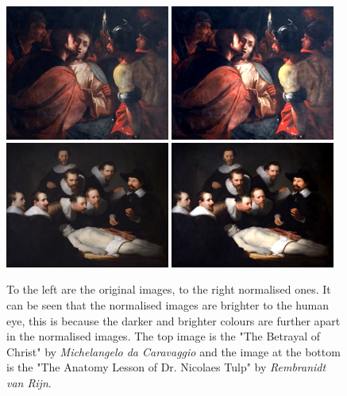 \documentclass[11pt,a4paper,draft]{report}
\begin{document}
\begin{multicols}{2}
\begin{figure}[tbp]
\centering
\includegraphics[width=0.48\textwidth]{nirp_caravaggio_1962_139_1}
\includegraphics[width=0.48\textwidth]{caravaggio_1962_139_1}
\includegraphics[width=0.48\textwidth]{nirp_rembrandt_eu_464}
\includegraphics[width=0.48\textwidth]{rembrandt_eu_464}
\caption[Colour normalisation]{To the left are the original images, to the
right normalised ones.  It can be seen that the normalised images are brighter
to the human eye, this is because the darker and brighter colours are further
apart in the normalised images.  The top image is the "The Betrayal of Christ"
by \emph{Michelangelo da Caravaggio} and the image at the bottom is the "The
Anatomy Lesson of Dr. Nicolaes Tulp" by \emph{Rembranidt van Rijn}.}
\label{fig:norm}
\end{figure}


\end{multicols}
\end{document}
